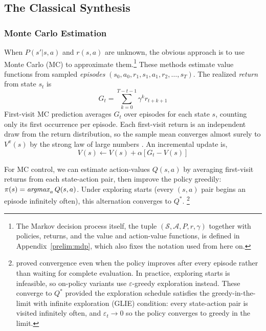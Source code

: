
\FloatBarrier
\subsection{The Classical Synthesis}
\label{sec:classical_synthesis}

\subsubsection{Monte Carlo Estimation}

When $P(s'|s,a)$ and $r(s,a)$ are unknown, the obvious approach is to use Monte Carlo (MC) to approximate them.\footnote{The Markov decision process itself, the tuple $(\mathcal{S}, \mathcal{A}, P, r, \gamma)$ together with policies, returns, and the value and action-value functions, is defined in Appendix~\ref{prelim:mdp}, which also fixes the notation used from here on.} These methods estimate value functions from sampled \textit{episodes} $(s_0, a_0, r_1, s_1, a_1, r_2, \ldots, s_T)$. The realized \textit{return} from state $s_t$ is
\begin{equation}
G_t = \sum_{k=0}^{T-t-1} \gamma^k r_{t+k+1}
\end{equation}
First-visit MC prediction averages $G_t$ over episodes for each state $s$, counting only its first occurrence per episode. Each first-visit return is an independent draw from the return distribution, so the sample mean converges almost surely to $V^\pi(s)$ by the strong law of large numbers \citep{sutton2018}. An incremental update is, $$V(s) \leftarrow V(s) + \alpha[G_t - V(s)]$$

For MC control, we can estimate action-values $Q(s,a)$ by averaging first-visit returns from each state-action pair, then improve the policy greedily: $\pi(s) = \mathop{\it argmax}_a Q(s,a)$. Under exploring starts (every $(s,a)$ pair begins an episode infinitely often), this alternation converges to $Q^*$. \footnote{\citet{tsitsiklis2002} proved convergence even when the policy improves after every episode rather than waiting for complete evaluation. In practice, exploring starts is infeasible, so on-policy variants use $\varepsilon$-greedy exploration instead. These converge to $Q^*$ provided the exploration schedule satisfies the greedy-in-the-limit with infinite exploration (GLIE) condition: every state-action pair is visited infinitely often, and $\varepsilon_t \to 0$ so the policy converges to greedy in the limit.}

